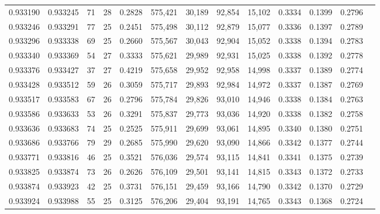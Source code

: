 \begin{tabular}{rrrrrrrrrrrrr}
0.933190 & 0.933245 &    71 &  28 &                                     0.2828 & 575,421 &  30,189 &  92,854 &  15,102 & 0.3334 & 0.1399 & 0.2796 \\
0.933246 & 0.933291 &    77 &  25 &                                     0.2451 & 575,498 &  30,112 &  92,879 &  15,077 & 0.3336 & 0.1397 & 0.2789 \\
0.933296 & 0.933338 &    69 &  25 &                                     0.2660 & 575,567 &  30,043 &  92,904 &  15,052 & 0.3338 & 0.1394 & 0.2783 \\
0.933340 & 0.933369 &    54 &  27 &                                     0.3333 & 575,621 &  29,989 &  92,931 &  15,025 & 0.3338 & 0.1392 & 0.2778 \\
0.933376 & 0.933427 &    37 &  27 &                                     0.4219 & 575,658 &  29,952 &  92,958 &  14,998 & 0.3337 & 0.1389 & 0.2774 \\
0.933428 & 0.933512 &    59 &  26 &                                     0.3059 & 575,717 &  29,893 &  92,984 &  14,972 & 0.3337 & 0.1387 & 0.2769 \\
0.933517 & 0.933583 &    67 &  26 &                                     0.2796 & 575,784 &  29,826 &  93,010 &  14,946 & 0.3338 & 0.1384 & 0.2763 \\
0.933586 & 0.933633 &    53 &  26 &                                     0.3291 & 575,837 &  29,773 &  93,036 &  14,920 & 0.3338 & 0.1382 & 0.2758 \\
0.933636 & 0.933683 &    74 &  25 &                                     0.2525 & 575,911 &  29,699 &  93,061 &  14,895 & 0.3340 & 0.1380 & 0.2751 \\
0.933686 & 0.933766 &    79 &  29 &                                     0.2685 & 575,990 &  29,620 &  93,090 &  14,866 & 0.3342 & 0.1377 & 0.2744 \\
0.933771 & 0.933816 &    46 &  25 &                                     0.3521 & 576,036 &  29,574 &  93,115 &  14,841 & 0.3341 & 0.1375 & 0.2739 \\
0.933825 & 0.933874 &    73 &  26 &                                     0.2626 & 576,109 &  29,501 &  93,141 &  14,815 & 0.3343 & 0.1372 & 0.2733 \\
0.933874 & 0.933923 &    42 &  25 &                                     0.3731 & 576,151 &  29,459 &  93,166 &  14,790 & 0.3342 & 0.1370 & 0.2729 \\
0.933924 & 0.933988 &    55 &  25 &                                     0.3125 & 576,206 &  29,404 &  93,191 &  14,765 & 0.3343 & 0.1368 & 0.2724 \\

\end{tabular}
